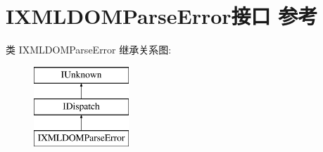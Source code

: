 \hypertarget{interface_i_x_m_l_d_o_m_parse_error}{}\section{I\+X\+M\+L\+D\+O\+M\+Parse\+Error接口 参考}
\label{interface_i_x_m_l_d_o_m_parse_error}
类 I\+X\+M\+L\+D\+O\+M\+Parse\+Error 继承关系图\+:\begin{figure}[H]
\begin{center}
\leavevmode
\includegraphics[height=3.000000cm]{interface_i_x_m_l_d_o_m_parse_error}
\end{center}
\end{figure}
